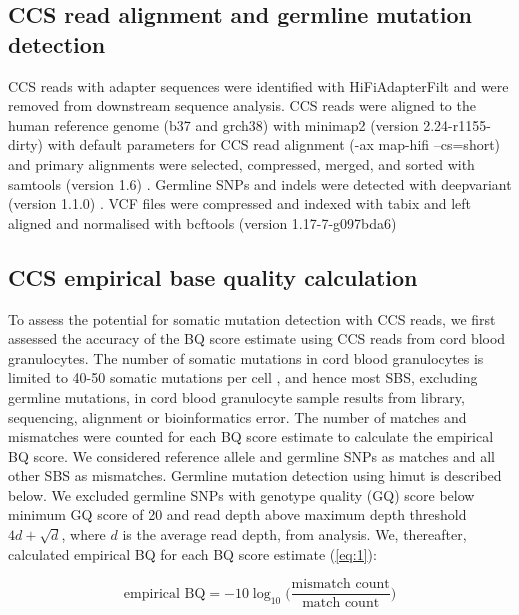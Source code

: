 \subsection{CCS read alignment and germline mutation detection}
CCS reads with adapter sequences were identified with HiFiAdapterFilt \cite{Sim2022-pi} and were removed from downstream sequence analysis. CCS reads were aligned to the human reference genome (b37 and grch38) with minimap2 (version 2.24-r1155-dirty) with default parameters for CCS read alignment (-ax map-hifi --cs=short) \cite{Li2018-am} and primary alignments were selected, compressed, merged, and sorted with samtools (version 1.6) \cite{Li2009-qp}. Germline SNPs and indels were detected with deepvariant (version 1.1.0) \cite{Poplin2018-ub}. VCF files were compressed and indexed with tabix \cite{Li2011-zj} and left aligned and normalised with bcftools (version 1.17-7-g097bda6) \cite{Li2011-ag}

\subsection{CCS empirical base quality calculation}

To assess the potential for somatic mutation detection with CCS reads, we first assessed the accuracy of the BQ score estimate using CCS reads from cord blood granulocytes. The number of somatic mutations in cord blood granulocytes is limited to 40-50 somatic mutations per cell \cite{Osorio2018-mh}, and hence most SBS, excluding germline mutations, in cord blood granulocyte sample results from library, sequencing, alignment or bioinformatics error. The number of matches and mismatches were counted for each BQ score estimate to calculate the empirical BQ score. We considered reference allele and germline SNPs as matches and all other SBS as mismatches. Germline mutation detection using himut is described below. We excluded germline SNPs with genotype quality (GQ) score below minimum GQ score of 20 and read depth above maximum depth threshold $4d + \sqrt{d}$, where $d$ is the average read depth, from analysis. We, thereafter, calculated empirical BQ for each BQ score estimate (\ref{eq:1}): 

\begin{equation} \label{eq:1}
\text{empirical BQ} = -10\log_{10} \Big( \frac{\text{mismatch count}}{\text{match count}} \Big)
\end{equation}


